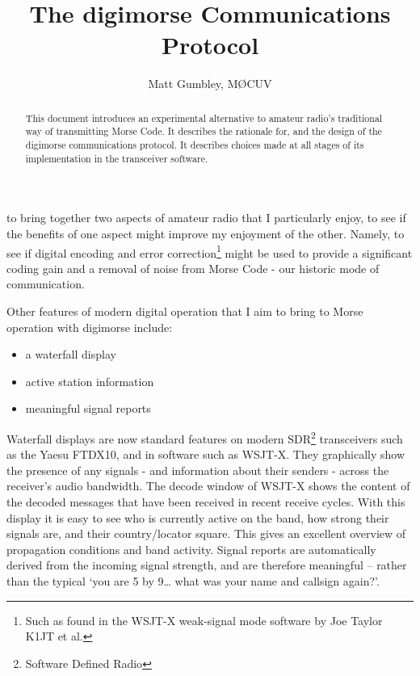 \documentclass[a4paper]{tufte-handout}
\title{The digimorse Communications Protocol}
\author{Matt Gumbley, M{\O}CUV}
\begin{document}
    \maketitle%

    \begin{abstract}
        \noindent
        This document introduces an experimental alternative to amateur radio's traditional way of transmitting Morse
        Code. It describes the rationale for, and the design of the digimorse communications protocol. It describes
        choices made at all stages of its implementation in the transceiver software.
    \end{abstract}


     to bring together two aspects of amateur radio that I
    particularly
    enjoy, to see if the benefits of one aspect might improve my enjoyment of the other.
    Namely, to see if digital encoding and error correction\footnote{Such as found in the WSJT-X weak-signal mode
    software by Joe Taylor K1JT et al.} might be used to provide a significant coding gain and a removal of noise
    from Morse Code - our historic mode of communication.

    Other features of modern digital operation that I aim to bring to Morse operation with digimorse include:
    \begin{itemize}
        \setlength\itemsep{-0.5em}
        \item a waterfall display
        \item active station information
        \item meaningful signal reports
    \end{itemize}

    Waterfall displays are now standard features on modern SDR\footnote{Software Defined Radio} transceivers such as
    the Yaesu FTDX10, and in software such as WSJT-X\cite{FT4FT8}.
    They graphically show the presence of any signals - and information about their senders - across the receiver's
    audio bandwidth.
    The decode window of WSJT-X shows the content of the decoded messages that have been received in recent
    receive cycles.
    With this display it is easy to see who is currently active on the band, how strong their signals are, and their
    country/locator square.
    This gives an excellent overview of propagation conditions and band activity.
    Signal reports are automatically derived from the incoming signal strength, and are therefore meaningful – rather
    than the typical ‘you are 5 by 9… what was your name and callsign again?’.
\end{document}
